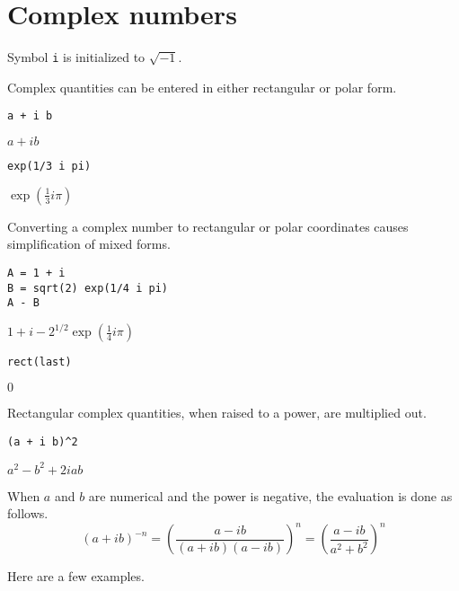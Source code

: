\documentclass[12pt]{article}
\begin{document}
\section*{Complex numbers}

Symbol \verb$i$ is initialized to $\sqrt{-1}$.

\bigskip

Complex quantities can be entered in either rectangular or polar form.

{\color{blue}
\begin{verbatim}
a + i b
\end{verbatim}
}

$\displaystyle a+ib$

{\color{blue}
\begin{verbatim}
exp(1/3 i pi)
\end{verbatim}
}

$\displaystyle \exp\left(\tfrac{1}{3}i\pi\right)$

\bigskip

Converting a complex number to rectangular or polar coordinates causes
simplification of mixed forms.

{\color{blue}
\begin{verbatim}
A = 1 + i
B = sqrt(2) exp(1/4 i pi)
A - B
\end{verbatim}
}

$\displaystyle 1+i-2^{1/2}\exp\left(\tfrac{1}{4}i\pi\right)$

{\color{blue}
\begin{verbatim}
rect(last)
\end{verbatim}
}

$\displaystyle 0$

\bigskip

Rectangular complex quantities, when raised to a power, are multiplied out.

{\color{blue}
\begin{verbatim}
(a + i b)^2
\end{verbatim}
}

$\displaystyle a^2-b^2+2iab$

\bigskip

When $a$ and $b$ are numerical and the power is negative, the evaluation is done as follows.
\begin{equation*}
(a+ib)^{-n}
=\left(\frac{a-ib}{(a+ib)(a-ib)}\right)^n=
\left(\frac{a-ib}{a^2+b^2}\right)^n
\end{equation*}

Here are a few examples.
\end{document}
